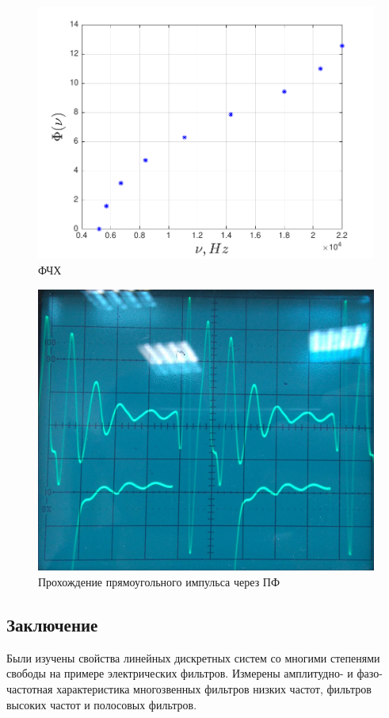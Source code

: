 \begin{figure}[H]
	\centering
	\includegraphics[scale=0.9]{graph/graph6}
	\caption{ФЧХ}
	\label{fig:figure6}
\end{figure}





\begin{figure}[H]
	\centering
	\includegraphics[scale=0.25]{images/2}
	\caption{Прохождение прямоугольного импульса через ПФ}
	\label{fig:ris2}
\end{figure}

\subsection{Заключение}
Были изучены свойства линейных дискретных систем со многими степенями свободы на примере электрических фильтров. Измерены амплитудно- и фазо-частотная характеристика многозвенных фильтров низких частот, фильтров высоких частот и полосовых фильтров.  

